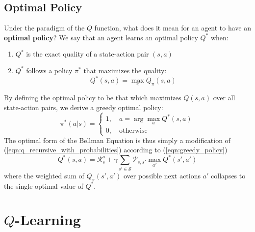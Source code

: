 \documentclass[journal, onecolumn, 12pt, draftclsnofoot]{IEEEtran}
\numberwithin{equation}{section}
\newcommand{\kword}[1]{\textbf{#1}}
\newcommand{\mc}[1]{\mathcal{#1}}
\begin{document}
		\subsection{Optimal Policy}
		\par Under the paradigm of the $Q$ function, what does it mean for an agent to have an \kword{optimal policy}? We say that an agent learns an optimal policy $Q^*$ when:
		\begin{enumerate}
			\item $Q^*$ is the exact quality of a state-action pair $(s, a)$
			\item $Q^*$ follows a policy $\pi^*$ that maximizes the quality:
			\begin{equation}
				Q^*(s,a) = \max_\pi Q_\pi(s,a)
			\end{equation}
		\end{enumerate}
		By defining the optimal policy to be that which maximizes $Q(s,a)$ over all state-action pairs, we derive a greedy optimal policy:
		\begin{equation}
			\label{eqn:greedy_policy}
			\pi^*(a \vert s) = \begin{cases}
				1, \quad a = \arg \max_a Q^*(s, a) \\
				0, \quad \text{otherwise}
		\end{cases}
		\end{equation}
		The optimal form of the Bellman Equation is thus simply a modification of (\ref{eqn:q_recursive_with_probabilities}) according to (\ref{eqn:greedy_policy})
		\begin{equation}
			Q^*(s,a) = \mc{R}_s^a + \gamma \sum_{s' \in \mc{S}} \mc{P}_{s,s'} \max_{a'} Q^*(s', a')
		\end{equation}
		where the weighted sum of $Q_\pi(s', a')$ over possible next actions $a'$ collapses to the single optimal value of $Q^*$.
		\section{$Q$-Learning}
\end{document}
